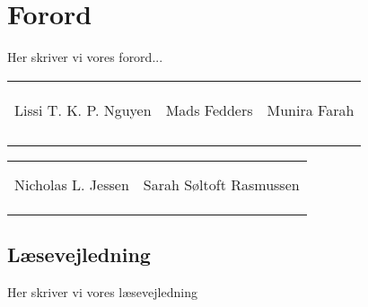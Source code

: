 \chapter*{Forord}
Her skriver vi vores forord...


\phantom{Luft}
\phantom{Luft}
\phantom{Luft}
\phantom{Luft}
\phantom{Luft}
\phantom{Luft}

\begin{table}[H]
	\centering
		\begin{tabular}{c c c}
		&&\\
			\underline{\phantom{mmmmmmmmmmmmmm}} & \underline{\phantom{mmmmmmmmmmmmmm}} & \underline{\phantom{mmmmmmmmmmmmmm}} \\ \\
			Lissi T. K. P. Nguyen			& Mads Fedders 		& Munira Farah 			\\
			&&\\
			&&\\
			&&\\
			&&\\
			
		 																				
																					
		\end{tabular}
		\begin{tabular}{c c}
		    &  \\
		     \underline{\phantom{mmmmmmmmmmmmmm}} & \underline{\phantom{mmmmmmmmmmmmmm}} & \\
			Nicholas L. Jessen			& Sarah Søltoft	Rasmussen		\\
			&&\\
			&&\\
		    & 
		\end{tabular}
\end{table}

\newpage


\section*{Læsevejledning} 
Her skriver vi vores læsevejledning